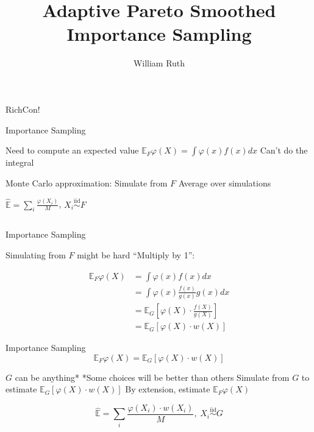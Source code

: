 \documentclass[14pt]{beamer}
\title[]{Adaptive Pareto Smoothed Importance Sampling}
\author{William Ruth}
\institute[]{Joint work with Payman Nickchi}
\date{\vspace{-3cm}}
\newcommand{\bE}{\mathbb{E}}
\begin{document}
\begin{frame}
    \titlepage
\end{frame}

\begin{frame}
    RichCon!
\end{frame}


\begin{frame}{Importance Sampling}
    \begin{outline}
        \1 Need to compute an expected value
            \2 $\bE_F \varphi(X) = \int \varphi(x) f(x) dx$
        \1 Can't do the integral \newline

        \1 Monte Carlo approximation:
            \2 Simulate from $F$
            \2 Average over simulations \newline

        \1 $\hat{\bE} = \sum_i \frac{\varphi(X_i)}{M}$, $X_i \overset{\mathrm{iid}}{\sim} F$
    \end{outline}
    \begin{equation*}
    \end{equation*}
\end{frame}

\begin{frame}{Importance Sampling}
    \begin{outline}
        \1 Simulating from $F$ might be hard
        \1 ``Multiply by 1'':
    \end{outline}
    \begin{align*}
        \bE_F \varphi(X) &= \int \varphi(x) f(x) dx\\
        & = \int \varphi(x) \frac{f(x)}{g(x)} g(x) dx\\
        &= \bE_G \left[ \varphi(X) \cdot \frac{f(X)}{g(X)} \right]\\
        &= \bE_G \left[ \varphi(X) \cdot w(X) \right]
    \end{align*}
    
\end{frame}

\begin{frame}{Importance Sampling}
    \begin{equation*}
        \bE_F \varphi(X) = \bE_G \left[ \varphi(X) \cdot w(X) \right]
    \end{equation*}
    \vspace{-0.5cm}
    \begin{outline}
        \1 $G$ can be anything*
            \2 *Some choices will be better than others
        \1 Simulate from $G$ to estimate $\bE_G \left[ \varphi(X) \cdot w(X) \right]$
            \2 By extension, estimate $\bE_F \varphi(X)$ \newline
    \end{outline}  
    \begin{equation*}
        \hat{\bE} = \sum_i \frac{\varphi(X_i) \cdot w(X_i)}{M} \mathrm{,} \hspace{3pt} X_i \overset{\mathrm{iid}}{\sim} G
    \end{equation*}  
\end{frame}
\end{document}
